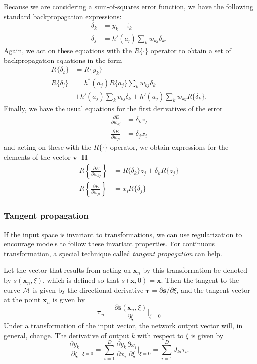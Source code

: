 \documentclass[a4paper]{report}
\renewcommand{\bf}{\mathbf}
\renewcommand{\cal}{\mathcal}
\newcommand{\imp}[1]{{\color{blue}\textit{#1}}}
\newcommand{\bs}{\boldsymbol}
\begin{document}
Because we are considering a sum-of-squares error function, we have the following standard backpropagation expressions:
\begin{align}
	\delta_k &= y_k - t_k \\
	\delta_j &= h'(a_j) \sum_k w_{kj} \delta_k.
\end{align}
Again, we act on these equations with the $R\{\cdot \}$ operator to obtain a set of backpropagation equations in the form
\begin{align}
	R\{\delta_k\} &= R\{y_k\}\\
	R\{\delta_j \}&= h^{''}(a_j)R\{a_j\} \sum_k w_{kj}\delta_k\\
	&+h'(a_j)\sum_k v_{kj}\delta_k + h'(a_j)\sum_k w_{kj} R\{\delta_k \}.
\end{align}
Finally, we have the usual equations for the first derivatives of the error
\begin{align}
	\frac{\partial E}{\partial w_{kj}} &= \delta_k z_j \\
	\frac{\partial E}{\partial w_{ji}} &= \delta_j x_i
\end{align}
and acting on these with the $R\{ \cdot \}$ operator, we obtain expressions for the elements of the vector $\bf{v}^{\intercal} \bf{H}$
\begin{align}
	R\left\{ \frac{\partial E}{\partial w_{kj}} \right\} &= R\{\delta_k \} z_j + \delta_k R\{z_j\}\\
	R\left\{ \frac{\partial E}{\partial w_{ji}} \right\} &= x_i R\{\delta_j \}
\end{align}
\subsubsection{Tangent propagation} \label{tangentP}
If the input space is invariant to transformations, we can use regularization to encourage models to follow these invariant properties. For continuous transformation, a special technique called \imp{tangent propagation} can help.

Let the vector that results from acting on $\bf{x}_n$ by this transformation be denoted by $s(\bf{x}_n,\xi)$, which is defined so that $s(\bf{x},0) = \bf{x}$. Then the tangent to the curve $\cal{M}$ is given by the directional derivative $\bf{\tau} = \partial \bf{s}/\partial \xi$, and the tangent vector at the point $\bf{x}_n$ is given by
\begin{equation}
	\bs{\tau}_n = \frac{\partial \bf{s}(\bf{x}_n,\xi)}{\partial \xi} \bigg|_{\xi = 0}
\end{equation}
Under a transformation of the input vector, the network output vector will, in general, change. The derivative of output $k$ with respect to $\xi$ is given by
\begin{equation}
	\frac{\partial y_k}{\partial \xi}\bigg|_{\xi = 0} = \sum_{i=1}^{D} \frac{\partial y_k}{\partial x_i}\frac{\partial x_i}{\partial \xi}\bigg|_{\xi = 0} = \sum_{i=1}^{D} J_{ki} \tau_i.
\end{equation}
\end{document}
